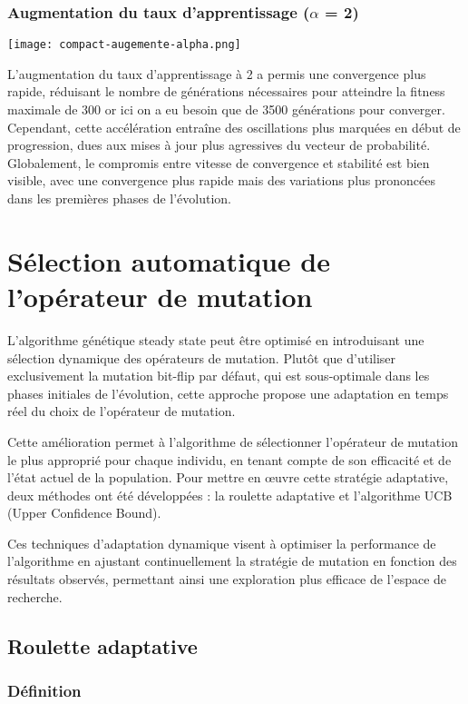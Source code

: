 \documentclass{article}
\begin{document}
\subsubsection{Augmentation du taux d'apprentissage ($\alpha$ = 2)}

\texttt{[image: compact-augemente-alpha.png]}

L'augmentation du taux d'apprentissage à 2 a permis une convergence plus rapide, réduisant le nombre de générations nécessaires pour atteindre la fitness maximale de 300 or ici on a eu besoin que de 3500 générations pour converger. Cependant, cette accélération entraîne des oscillations plus marquées en début de progression, dues aux mises à jour plus agressives du vecteur de probabilité. Globalement, le compromis entre vitesse de convergence et stabilité est bien visible, avec une convergence plus rapide mais des variations plus prononcées dans les premières phases de l'évolution.

\section{Sélection automatique de l’opérateur de mutation}

L'algorithme génétique steady state peut être optimisé en introduisant une sélection dynamique des opérateurs de mutation. Plutôt que d'utiliser exclusivement la mutation bit-flip par défaut, qui est sous-optimale dans les phases initiales de l'évolution, cette approche propose une adaptation en temps réel du choix de l'opérateur de mutation.

Cette amélioration permet à l'algorithme de sélectionner l'opérateur de mutation le plus approprié pour chaque individu, en tenant compte de son efficacité et de l'état actuel de la population. Pour mettre en œuvre cette stratégie adaptative, deux méthodes ont été développées : la roulette adaptative et l'algorithme UCB (Upper Confidence Bound).

Ces techniques d'adaptation dynamique visent à optimiser la performance de l'algorithme en ajustant continuellement la stratégie de mutation en fonction des résultats observés, permettant ainsi une exploration plus efficace de l'espace de recherche.

\subsection{Roulette adaptative}
\subsubsection{Définition}
\end{document}
